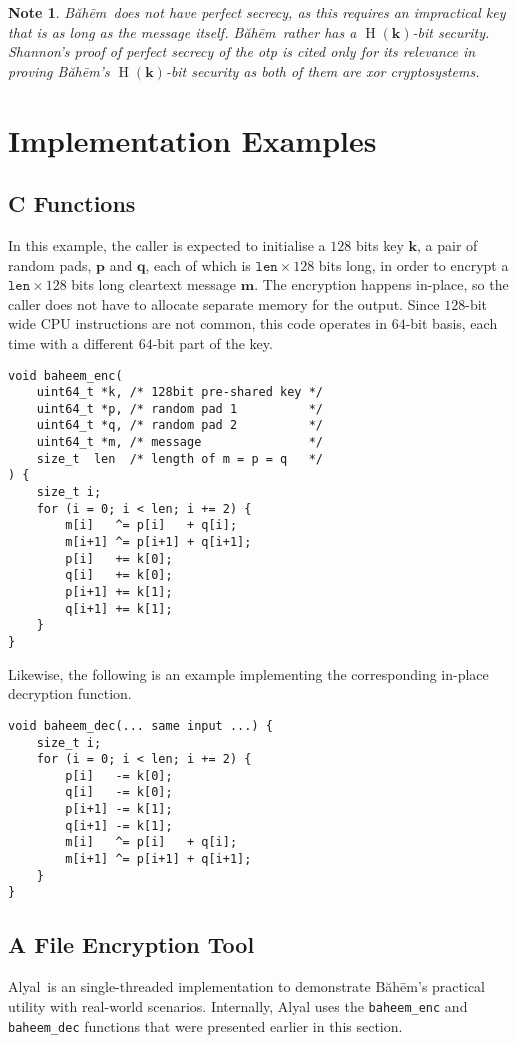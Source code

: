 \documentclass[twocolumn,hidelinks]{article}
\newcommand{\baheem}{Băhēm}
\newcommand{\alyal}{Alyal}
\DeclareMathOperator{\entropy}{H}
\newtheorem{note}{Note}
\begin{document}
\begin{note}
    \baheem\ does not have perfect secrecy, as this requires an impractical
    key that is as long as the message itself.  \baheem\ rather has a
    $\entropy(\mathbf{k})$-bit security.  Shannon's proof of perfect
    secrecy of the \gls{otp} is cited only for its relevance in proving
    \baheem's $\entropy(\mathbf{k})$-bit security as both of them are
    \gls{xor} cryptosystems.
\end{note}


\section{Implementation Examples}
\subsection{C Functions}
In this example, the caller is expected to initialise a $128$ bits key
$\mathbf{k}$, a pair of random pads, $\mathbf{p}$ and $\mathbf{q}$, each of
which is $\mathtt{len} \times 128$ bits long, in order to encrypt a
$\mathtt{len} \times 128$ bits long cleartext message $\mathbf{m}$. The
encryption happens in-place, so the caller does not have to allocate
separate memory for the output. Since $128$-bit wide CPU instructions are
not common, this code operates in $64$-bit basis, each time with a
different $64$-bit part of the key.

\begin{verbatim}
void baheem_enc(
    uint64_t *k, /* 128bit pre-shared key */
    uint64_t *p, /* random pad 1          */
    uint64_t *q, /* random pad 2          */
    uint64_t *m, /* message               */
    size_t  len  /* length of m = p = q   */
) {
    size_t i;
    for (i = 0; i < len; i += 2) {
        m[i]   ^= p[i]   + q[i];
        m[i+1] ^= p[i+1] + q[i+1];
        p[i]   += k[0];
        q[i]   += k[0];
        p[i+1] += k[1];
        q[i+1] += k[1];
    }
}
\end{verbatim}
Likewise, the following is an example implementing the corresponding
in-place decryption function.
\begin{verbatim}
void baheem_dec(... same input ...) {
    size_t i;
    for (i = 0; i < len; i += 2) {
        p[i]   -= k[0];
        q[i]   -= k[0];
        p[i+1] -= k[1];
        q[i+1] -= k[1];
        m[i]   ^= p[i]   + q[i];
        m[i+1] ^= p[i+1] + q[i+1];
    }
}
\end{verbatim}


\subsection{A File Encryption Tool}
\alyal\ is an single-threaded implementation to demonstrate \baheem's
practical utility with real-world scenarios.  Internally, Alyal uses the
\texttt{baheem\_enc} and \texttt{baheem\_dec} functions that were presented
earlier in this section.
\end{document}

